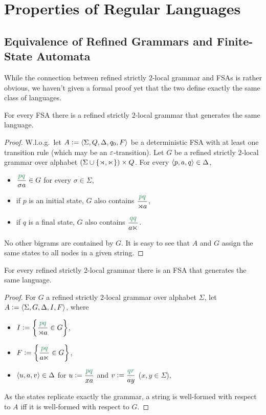 \section{Properties of Regular Languages}

\subsection{Equivalence of Refined Grammars and Finite-State Automata}

While the connection between refined strictly $2$-local grammar and FSAs is rather obvious, we haven't given a formal proof yet that the two define exactly the same class of languages.
%
\begin{lemma}
    For every FSA there is a refined strictly $2$-local grammar that generates the same language.
\end{lemma}
%
\begin{proof}
    W.l.o.g.\ let $A \mathrel{\mathop:}= \left \langle \Sigma, Q, \Delta, q_0, F \right \rangle $ be a deterministic FSA with at least one transition rule (which may be an $\varepsilon$-transition).
    Let $G$ be a refined strictly $2$-local grammar over alphabet $(\Sigma \cup \left \{ \rtimes, \ltimes \right \}) \times Q$.
    For every $\left \langle p,a,q \right \rangle  \in \Delta$,
    \begin{itemize}
        \item $\kState{pq}{\sigma a} \in G$ for every $\sigma \in \Sigma$,
        \item if $p$ is an initial state, $G$ also contains $\kState{pq}{\LeftEdge a}$,
        \item if $q$ is a final state, $G$ also contains $\kState{qq}{a \RightEdge}$.
    \end{itemize}
    No other bigrams are contained by $G$.
    It is easy to see that $A$ and $G$ assign the same states to all nodes in a given string.
\end{proof}
%
\begin{lemma}
    For every refined strictly $2$-local grammar there is an FSA that generates the same language.
\end{lemma}
%
\begin{proof}
    For $G$ a refined strictly $2$-local grammar over alphabet $\Sigma$, let $A \mathrel{\mathop:}= \left \langle \Sigma, G, \Delta, I, F \right \rangle $, where
    \begin{itemize}
        \item $I \is \setof{ \kState{pq}{\LeftEdge a} \in G }$,
        \item $F \is \setof{ \kState{pq}{a\RightEdge} \in G }$,
        \item $\left \langle u,a,v \right \rangle  \in \Delta$ for $u \is \kState{pq}{x a}$ and $v \is \kState{qr}{a y}$ ($x,y \in \Sigma$),
    \end{itemize}
    As the states replicate exactly the grammar, a string is well-formed with respect to $A$ iff it is well-formed with respect to $G$.
\end{proof}

